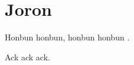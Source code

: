 \documentclass[doctor,final,11pt]{iscs-thesis}
\date{May 23, 2023}
\begin{document}
\maketitle



\frontmatter %
\tableofcontents %
\listoffigures %
\listoftables %
\mainmatter %

\chapter{Joron}

Honbun honbun, honbun honbun
\cite{4065825}. 


\begin{acknowledge}
Ack ack ack. 
\end{acknowledge}
\end{document}
